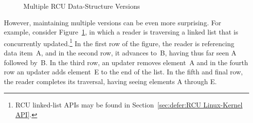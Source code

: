 \begin{figure}[tb]
\centering
{}
\caption{Multiple RCU Data-Structure Versions}
\label{fig:defer:Multiple RCU Data-Structure Versions}
\end{figure}

However, maintaining multiple versions can be even more surprising.
For example, consider
Figure~\ref{fig:defer:Multiple RCU Data-Structure Versions},
in which a reader is traversing a linked list that is concurrently
updated.\footnote{
	RCU linked-list APIs may be found in
	Section~\ref{sec:defer:RCU Linux-Kernel API}.}
In the first row of the figure, the reader is referencing data item~A,
and in the second row, it advances to~B, having thus far seen A followed by~B.
In the third row, an updater removes element~A and in the fourth row
an updater adds element~E to the end of the list.
In the fifth and final row, the reader completes its traversal, having
seeing elements A through E.

